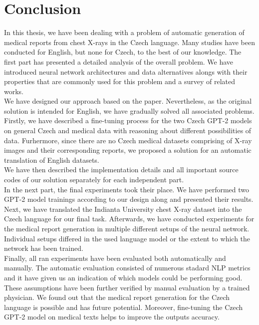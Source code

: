 \chapter*{Conclusion}

In this thesis, we have been dealing with a problem of automatic generation of medical reports from chest X-rays in the Czech language. Many studies have been conducted for English, but none for Czech, to the best of our knowledge. The first part has presented a detailed analysis of the overall problem. We have introduced neural network architectures and data alternatives alongs with their properties that are commonly used for this problem and a survey of related works.\\

We have designed our approach based on the \citet{alfarghaly2021automated} paper. Nevertheless, as the original solution is intended for English, we have gradually solved all associated problems. Firstly, we have described a fine-tuning process for the two Czech GPT-2 models on general Czech and medical data with reasoning about different possibilities of data. Furhermore, since there are no Czech medical datasets comprising of X-ray images and their corresponding reports, we proposed a solution for an automatic translation of English datasets. \\

We have then described the implementation details and all important source codes of our solution separately for each independent part.\\

In the next part, the final experiments took their place. We have performed two GPT-2 model trainings according to our design along and presented their results. Next, we have translated the Indianta University chest X-ray dataset into the Czech language for our final task. Afterwards, we have conducted experiments for the medical report generation in multiple different setups of the neural network. Individual setups differed in the used language model or the extent to which the network has been trained.\\

Finally, all ran experiments have been evaluated both automatically and manually. The automatic evaluation consisted of numerous stadard NLP metrics and it have given us an indication of which models could be performing good. These assumptions have been further verified by manual evaluation by a trained physician. We found out that the medical report generation for the Czech language is possible and has future potential. Moreover, fine-tuning the Czech GPT-2 model on medical texts helps to improve the outputs accuracy.
\newpage

